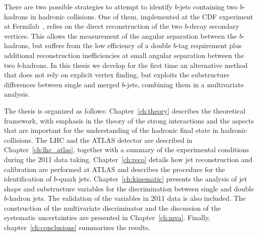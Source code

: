 
 







There are two possible strategies to attempt to identify $b$-jets containing two $b$-hadrons in hadronic collisions. One of them, implemented at the CDF experiment at Fermilab~\cite{CDFAzimutalCorrelation}, relies on the direct reconstruction of the two $b$-decay secondary vertices. This %
allows the measurement of the angular separation between the $b$-hadrons, but suffers from the low efficiency of a double $b$-tag requirement plus additional reconstruction inefficiencies at small angular separation between the two $b$-hadrons. In this thesis we develop for the first time an alternative method that does not rely on explicit vertex finding, but exploits the substructure differences between single and merged $b$-jets, combining them in a multivariate analysis. 

The thesis is organized as follows: Chapter~\ref{ch:theory} describes the theoretical framework, with emphasis in the theory of the strong interactions and the aspects that are important for the understanding of the hadronic final state in hadronic collisions. The LHC and the ATLAS detector are described in Chapter~\ref{ch:lhc_atlas}, together with a summary of the experimental conditions during the 2011 data taking.  Chapter~\ref{ch:reco} details how jet reconstruction and calibration are performed at ATLAS and describes the procedure for the identification of $b$-quark jets. Chapter~\ref{ch:kinematic} presents the analysis of jet shape and substructure variables for the discrimination between single and double $b$-hadron jets. The validation of the variables in 2011 data is also included.   The construction of the multivariate discriminator  and the discussion of the systematic uncertainties are presented in Chapter~\ref{ch:mva}. 
Finally, chapter~\ref{ch:conclusions} summarizes the results. 




